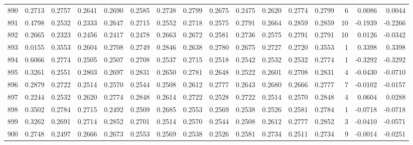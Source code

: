 \begin{tabular}{lrrrrrrrrrrrrrrr}
890 &      0.2713 &  0.2757 &  0.2641 &  0.2690 &  0.2585 &  0.2738 &  0.2799 &  0.2675 &  0.2475 &  0.2620 &   0.2774 &     0.2799 &      6 &                    0.0086 &                     0.0044 \\
891 &      0.4798 &  0.2532 &  0.2333 &  0.2647 &  0.2715 &  0.2552 &  0.2718 &  0.2575 &  0.2791 &  0.2664 &   0.2859 &     0.2859 &     10 &                   -0.1939 &                    -0.2266 \\
892 &      0.2665 &  0.2323 &  0.2456 &  0.2417 &  0.2478 &  0.2663 &  0.2672 &  0.2581 &  0.2736 &  0.2575 &   0.2791 &     0.2791 &     10 &                    0.0126 &                    -0.0342 \\
893 &      0.0155 &  0.3553 &  0.2604 &  0.2708 &  0.2749 &  0.2846 &  0.2638 &  0.2780 &  0.2675 &  0.2727 &   0.2720 &     0.3553 &      1 &                    0.3398 &                     0.3398 \\
894 &      0.6066 &  0.2774 &  0.2505 &  0.2507 &  0.2708 &  0.2537 &  0.2715 &  0.2518 &  0.2542 &  0.2532 &   0.2532 &     0.2774 &      1 &                   -0.3292 &                    -0.3292 \\
895 &      0.3261 &  0.2551 &  0.2803 &  0.2697 &  0.2831 &  0.2650 &  0.2781 &  0.2648 &  0.2522 &  0.2601 &   0.2708 &     0.2831 &      4 &                   -0.0430 &                    -0.0710 \\
896 &      0.2879 &  0.2722 &  0.2514 &  0.2570 &  0.2544 &  0.2508 &  0.2612 &  0.2777 &  0.2643 &  0.2680 &   0.2666 &     0.2777 &      7 &                   -0.0102 &                    -0.0157 \\
897 &      0.2244 &  0.2532 &  0.2620 &  0.2774 &  0.2848 &  0.2614 &  0.2722 &  0.2528 &  0.2722 &  0.2514 &   0.2570 &     0.2848 &      4 &                    0.0604 &                     0.0288 \\
898 &      0.3502 &  0.2784 &  0.2715 &  0.2492 &  0.2509 &  0.2685 &  0.2553 &  0.2569 &  0.2538 &  0.2526 &   0.2581 &     0.2784 &      1 &                   -0.0718 &                    -0.0718 \\
899 &      0.3262 &  0.2691 &  0.2714 &  0.2852 &  0.2701 &  0.2514 &  0.2570 &  0.2544 &  0.2508 &  0.2612 &   0.2777 &     0.2852 &      3 &                   -0.0410 &                    -0.0571 \\
900 &      0.2748 &  0.2497 &  0.2666 &  0.2673 &  0.2553 &  0.2569 &  0.2538 &  0.2526 &  0.2581 &  0.2734 &   0.2511 &     0.2734 &      9 &                   -0.0014 &                    -0.0251 \\

\end{tabular}
